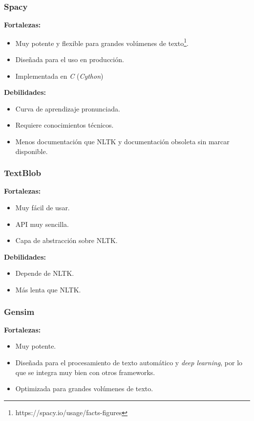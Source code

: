 \documentclass[a4paper,twocolumn]{article}
\begin{document}
    \subsubsection{Spacy}\label{subsubsec:spacy}

    \textbf{Fortalezas:}
    \begin{itemize}
        \item Muy potente y flexible para grandes volúmenes de texto\footnote{https://spacy.io/usage/facts-figures}.
        \item Diseñada para el uso en producción.
        \item Implementada en \textit{C} (\textit{Cython})\cite{spacy.cython}
    \end{itemize}

    \textbf{Debilidades:}
    \begin{itemize}
        \item Curva de aprendizaje pronunciada.
        \item Requiere conocimientos técnicos.
        \item Menos documentación que NLTK y documentación obsoleta sin marcar disponible.
    \end {itemize}

    \subsubsection{TextBlob}\label{subsubsec:textblob}

    \textbf{Fortalezas:}
    \begin{itemize}
        \item Muy fácil de usar.
        \item API muy sencilla.
        \item Capa de abstracción sobre NLTK.
    \end {itemize}

    \textbf{Debilidades:}
    \begin{itemize}
        \item Depende de NLTK.
        \item Más lenta que NLTK.
    \end {itemize}

    \subsubsection{Gensim}\label{subsubsec:gensim}

    \textbf{Fortalezas:}
    \begin{itemize}
        \item Muy potente.
        \item Diseñada para el procesamiento de texto automático y \textit{deep learning}, por lo que se integra muy bien con otros frameworks.
        \item Optimizada para grandes volúmenes de texto.
    \end {itemize}
\end{document}
